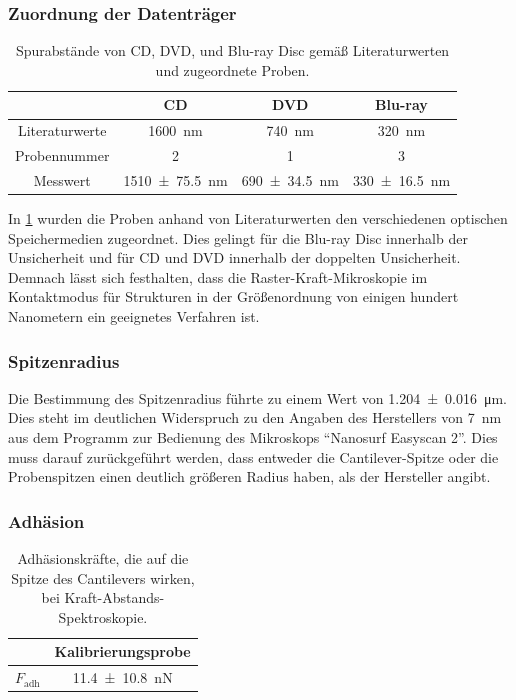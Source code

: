 \documentclass[
	a4paper,
	12pt,
	pagesize,
	ngerman
]{scrartcl}
\begin{document}
	\subsubsection{Zuordnung der Datenträger}
	\begin{table}[H]
		\centering
		\begin{tabular}{ c | c | c | c}
			&CD \cite{CD}&DVD \cite{DVD}&Blu-ray \cite{blu}\\ \hline
			Literaturwerte & \SI{1600}{\nano \meter} & \SI{740}{\nano \meter}& \SI{320}{\nano \meter}\\
			Probennummer & 2 & 1 & 3\\
			Messwert & \SI{1510+-75,5}{\nano \meter} & \SI{690 +-34,5}{\nano \meter} & \SI{330 +- 16,5}{\nano \meter}\\
		\end{tabular}
		\caption{Spurabstände von CD, DVD, und Blu-ray Disc gemäß Literaturwerten und zugeordnete Proben.}
		\label{tb_lit_Spurabstände}
	\end{table}
	In \cref{tb_lit_Spurabstände} wurden die Proben anhand von Literaturwerten den verschiedenen optischen Speichermedien zugeordnet.
	Dies gelingt für die Blu-ray Disc innerhalb der Unsicherheit und für CD und DVD innerhalb der doppelten Unsicherheit.
	Demnach lässt sich festhalten, dass die Raster-Kraft-Mikroskopie im Kontaktmodus für Strukturen in der Größenordnung von einigen hundert Nanometern ein geeignetes Verfahren ist.

	\subsubsection{Spitzenradius}
	Die Bestimmung des Spitzenradius führte zu einem Wert von \SI{1,204 +- 0,016}{\micro \meter}.
	Dies steht im deutlichen Widerspruch zu den Angaben des Herstellers von \SI{7}{\nano \meter} aus dem Programm zur Bedienung des Mikroskops \enquote{Nanosurf Easyscan 2}.
	Dies muss darauf zurückgeführt werden, dass entweder die Cantilever-Spitze oder die Probenspitzen einen deutlich größeren Radius haben, als der Hersteller angibt.

	\subsubsection{Adhäsion}


	\begin{table}[H]
		\centering
		\begin{tabular}{ c | c }
			 & Kalibrierungsprobe\\ \hline
			$F_\text{adh}$ & \SI{11.4+-10.8}{nN} \\
		\end{tabular}
		\caption{Adhäsionskräfte, die auf die Spitze des Cantilevers wirken, bei Kraft-Abstands-Spektroskopie.} %
		\label{tb_ds}
	\end{table}
\end{document}
